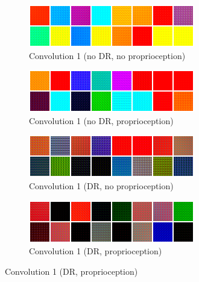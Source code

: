\begin{figure}
  \centering
  \begin{subfigure}{0.49\textwidth}
    \includegraphics[width=\textwidth]{figures/chapter6/act_max/jaco_nodr_noprop_conv1}
    \caption{Convolution 1 (no DR, no proprioception)}
  \end{subfigure}
  \begin{subfigure}{0.49\textwidth}
    \includegraphics[width=\textwidth]{figures/chapter6/act_max/jaco_nodr_prop_conv1}
    \caption{Convolution 1 (no DR, proprioception)}
  \end{subfigure}

  \begin{subfigure}{0.49\textwidth}
    \includegraphics[width=\textwidth]{figures/chapter6/act_max/jaco_dr_noprop_conv1}
    \caption{Convolution 1 (DR, no proprioception)}
  \end{subfigure}
  \begin{subfigure}{0.49\textwidth}
    \includegraphics[width=\textwidth]{figures/chapter6/act_max/jaco_dr_prop_conv1}
    \caption{Convolution 1 (DR, proprioception)}
  \end{subfigure}


\end{figure}
